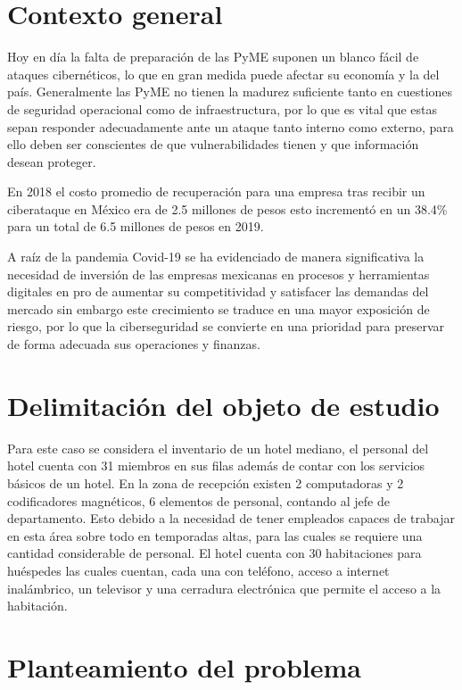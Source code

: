 \documentclass[10pt]{article}
\begin{document}
\section{Contexto general}

Hoy en día la falta de preparación de las PyME suponen un blanco fácil de ataques cibernéticos, lo que en gran medida puede afectar su economía y la del país. Generalmente las PyME no tienen la madurez suficiente tanto en cuestiones de seguridad operacional como de infraestructura, por lo que es vital que estas sepan responder adecuadamente ante un ataque tanto interno como externo, para ello deben ser conscientes de que vulnerabilidades tienen y que información desean proteger. 

En 2018 el costo promedio de recuperación para una empresa tras recibir un ciberataque en México era de 2.5 millones de pesos esto incrementó en un 38.4\% para un total de 6.5 millones de pesos en 2019. \cite{oxford-business-group-2021}

A raíz de la pandemia Covid-19 se ha evidenciado de manera significativa la necesidad de inversión de las empresas mexicanas en procesos y herramientas digitales en pro de aumentar su competitividad y satisfacer las demandas del mercado sin embargo este crecimiento se traduce en una mayor exposición de riesgo, por lo que la ciberseguridad se convierte en una prioridad para preservar de forma adecuada sus operaciones y finanzas. \cite{oxford-business-group-2021}

\section{Delimitación del objeto de estudio}\label{delimitacion}

Para este caso se considera el inventario de un hotel mediano, el personal del hotel cuenta con 31 miembros en sus filas además de contar con los servicios básicos de un hotel. En la zona de recepción existen 2 computadoras y 2 codificadores magnéticos, 6 elementos de personal, contando al jefe de departamento. Esto debido a la necesidad de tener empleados capaces de trabajar en esta área sobre todo en temporadas altas, para las cuales se requiere una cantidad considerable de personal. El hotel cuenta con 30 habitaciones para huéspedes las cuales cuentan, cada una con teléfono, acceso a internet inalámbrico, un televisor y una cerradura electrónica que permite el acceso a la habitación.

\section{Planteamiento del problema}\label{planteamiento}
\end{document}
